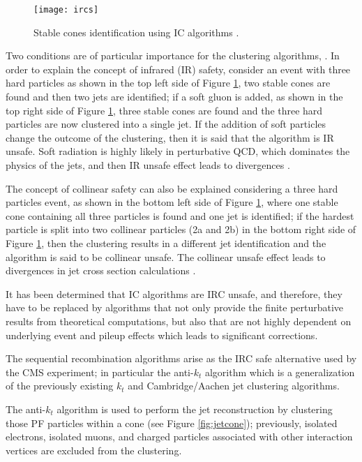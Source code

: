\begin{figure}[!h]
  \centering
  \texttt{[image: ircs]}
  \caption[Stable cones identification]{Stable cones identification using IC algorithms \cite{coco}.}\label{fig:irc}
\end{figure}

Two conditions are of particular importance for the clustering algorithms, . In order to explain the concept of infrared (IR) safety, consider an event with three hard particles as shown in the top left side of Figure \ref{fig:irc}, two stable cones are found and then two jets are identified; if a soft gluon is added, as shown in the top right side of Figure \ref{fig:irc}, three stable cones are found and the three hard particles are now clustered into a single jet. If the addition of soft particles change the outcome of the clustering, then it is said that the algorithm is IR unsafe. Soft radiation is highly likely in perturbative QCD, which dominates the physics of the jets, and then IR unsafe effect leads to divergences \cite{coco}.

The concept of collinear safety can also be explained considering a three hard particles event, as shown in the bottom left side of Figure \ref{fig:irc}, where one stable cone containing all three particles is found and one jet is identified; if the hardest particle is split into two collinear particles (2a and 2b) in the bottom right side of Figure \ref{fig:irc}, then the clustering results in a different jet identification and the algorithm is said to be collinear unsafe. The collinear unsafe effect leads to divergences in jet cross section calculations \cite{antikt}.       

It has been determined that IC algorithms are IRC unsafe, and therefore, they have to be replaced by algorithms that not only provide the finite perturbative results from theoretical computations, but also that are not highly dependent on underlying event and pileup effects which leads to significant corrections\cite{coco}.

The sequential recombination algorithms arise as the IRC safe alternative used by the CMS experiment; in particular the anti-$k_t$ algorithm which is a generalization of the previously existing $k_t$ \cite{kt} and Cambridge/Aachen \cite{ac} jet clustering algorithms.

The anti-$k_t$ algorithm is used to perform the jet reconstruction by clustering those PF particles within a cone (see Figure \ref{fig:jetcone}); previously, isolated electrons, isolated muons, and charged particles associated with other interaction vertices are excluded from the clustering.  

